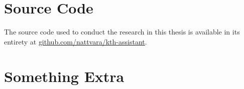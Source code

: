 ﻿\chapter{Source Code}
\label{appendix:source_code}


The source code used to conduct the research in this thesis is available in its entirety at \href{https://github.com/nattvara/kth-assistant}{github.com/nattvara/kth-assistant}.


\cleardoublepage




\chapter{Something Extra}
\label{sec:somethingExtra}
\cleardoublepage